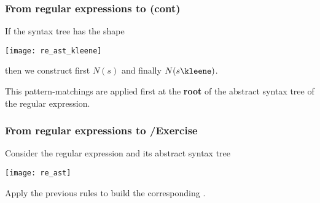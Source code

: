 %
\begin{frame}
\frametitle{From regular expressions to  (cont)}

If the syntax tree has the shape
\begin{center}
\texttt{[image: re\_ast\_kleene]}
\end{center}
then we construct first \(N(s)\) and finally \(N(s\text{\kleene})\).

\bigskip

This pattern-matchings are applied first at the \textbf{root} of the
abstract syntax tree of the regular expression.

\end{frame}

%
\begin{frame}
\frametitle{From regular expressions to /Exercise}

Consider the regular expression
\lparen{} \disj{}\rparen\kleene{} and its
abstract syntax tree
\begin{center}
\texttt{[image: re\_ast]}
\end{center}
Apply the previous rules to build the corresponding \eNFA.
\end{frame}
